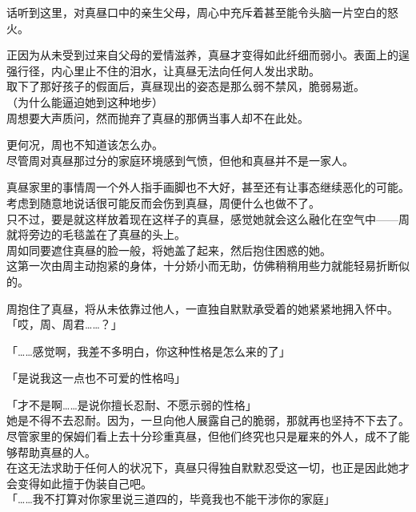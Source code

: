 话听到这里，对真昼口中的亲生父母，周心中充斥着甚至能令头脑一片空白的怒火。

正因为从未受到过来自父母的爱情滋养，真昼才变得如此纤细而弱小。表面上的逞强行径，内心里止不住的泪水，让真昼无法向任何人发出求助。\\

取下了那好孩子的假面后，真昼现出的姿态是那么弱不禁风，脆弱易逝。\\

（为什么能逼迫她到这种地步）\\

周想要大声质问，然而抛弃了真昼的那俩当事人却不在此处。

更何况，周也不知道该怎么办。\\

尽管周对真昼那过分的家庭环境感到气愤，但他和真昼并不是一家人。

真昼家里的事情周一个外人指手画脚也不大好，甚至还有让事态继续恶化的可能。考虑到随意地说话很可能反而会伤到真昼，周便什么也做不了。\\

只不过，要是就这样放着现在这样子的真昼，感觉她就会这么融化在空气中——周就将旁边的毛毯盖在了真昼的头上。\\

周如同要遮住真昼的脸一般，将她盖了起来，然后抱住困惑的她。\\

这第一次由周主动抱紧的身体，十分娇小而无助，仿佛稍稍用些力就能轻易折断似的。

周抱住了真昼，将从未依靠过他人，一直独自默默承受着的她紧紧地拥入怀中。\\

「哎，周、周君……？」

「……感觉啊，我差不多明白，你这种性格是怎么来的了」

「是说我这一点也不可爱的性格吗」

「才不是啊……是说你擅长忍耐、不愿示弱的性格」\\

她是不得不去忍耐。因为，一旦向他人展露自己的脆弱，那就再也坚持不下去了。\\

尽管家里的保姆们看上去十分珍重真昼，但他们终究也只是雇来的外人，成不了能够帮助真昼的人。\\

在这无法求助于任何人的状况下，真昼只得独自默默忍受这一切，也正是因此她才会变得如此擅于伪装自己吧。\\

「……我不打算对你家里说三道四的，毕竟我也不能干涉你的家庭」\\

